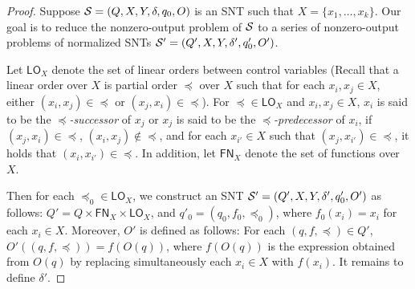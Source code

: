 \begin{appendix}
{\newcommand{\lo}{\mathsf{LO}}

\newcommand{\fn}{\mathsf{FN}}

\begin{proof}
Suppose ${\mathcal{S} } = (Q, X, Y, \delta, q_0, O)$ is an SNT such that $X=\{x_1,\dots, x_k\}$. Our goal is to reduce the nonzero-output problem of ${\mathcal{S} }$ to a series of  nonzero-output problems of normalized SNTs ${\mathcal{S} }'  = (Q', X, Y, \delta', q'_0, O')$.



Let $\lo_{X}$ denote the set of linear orders between control variables (Recall that a linear order over $X$ is partial order $\preceq$  over $X$ such that for each $x_i, x_j \in X$, either $(x_i, x_j) \in \preceq$ or $(x_j, x_i) \in \preceq$). For $\preceq \in \lo_X$ and $x_i, x_j \in X$,  $x_i$ is said to be the \emph{$\preceq$-successor} of  $x_j$ or $x_j$ is said to be the \emph{$\preceq$-predecessor} of $x_i$, if $(x_j, x_i) \in \preceq$, $(x_i, x_j) \not \in \preceq$, and for each $x_{i'} \in X$ such that $(x_j, x_{i'}) \in \preceq$, it holds that $(x_i, x_{i'}) \in \preceq$. In addition, let $\fn_X$ denote the set of functions over $X$.

Then for each $\preceq_0 \in \lo_X$, we construct an SNT ${\mathcal{S} }'= (Q', X, Y, \delta', q'_0, O')$ as follows: $Q'= Q \times \fn_X \times \lo_X$, and $q'_0=(q_0, f_0, \preceq_0)$, where $f_0(x_i)=x_i$ for each $x_i \in X$. Moreover, $O'$ is defined as follows: For each $(q, f, \preceq) \in Q'$, $O'((q, f, \preceq)) = f(O(q))$, where $f(O(q))$ is the expression obtained from $O(q)$ by replacing simultaneously each $x_i \in X$ with $f(x_i)$. It remains to define $\delta'$.


\end{proof}}
\end{appendix}
